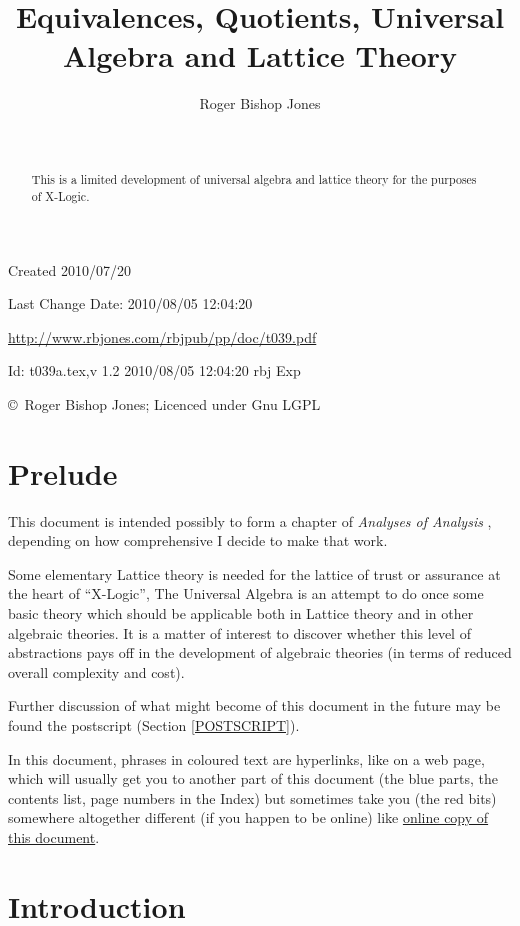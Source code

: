 \documentclass[11pt]{article}
\title{Equivalences, Quotients, Universal Algebra and Lattice Theory}
\author{Roger Bishop Jones}
\date{\ }
\begin{document}
\begin{titlepage}
\maketitle
\begin{abstract}
This is a limited development of universal algebra and lattice theory for the purposes of X-Logic.
\end{abstract}
\vfill

\begin{centering}
{\footnotesize

Created 2010/07/20

Last Change $ $Date: 2010/08/05 12:04:20 $ $

\href{http://www.rbjones.com/rbjpub/pp/doc/t039.pdf}
{http://www.rbjones.com/rbjpub/pp/doc/t039.pdf}

$ $Id: t039a.tex,v 1.2 2010/08/05 12:04:20 rbj Exp $ $

\copyright\ Roger Bishop Jones; Licenced under Gnu LGPL

}%
\end{centering}

\thispagestyle{empty}
\end{titlepage}

\newpage
\addtocounter{page}{1}
{\parskip=0pt\tableofcontents}

\section{Prelude}

This document is intended possibly to form a chapter of {\it Analyses of Analysis} \cite{rbjb001}, depending on how comprehensive I decide to make that work.

Some elementary Lattice theory is needed for the lattice of trust or assurance at the heart of ``X-Logic'',
The Universal Algebra is an attempt to do once some basic theory which should be applicable both in Lattice theory and in other algebraic theories.
It is a matter of interest to discover whether this level of abstractions pays off in the development of algebraic theories (in terms of reduced overall complexity and cost).

Further discussion of what might become of this document in the future may be found the postscript (Section \ref{POSTSCRIPT}).

In this document, phrases in coloured text are hyperlinks, like on a web page, which will usually get you to another part of this document (the blue parts, the contents list, page numbers in the Index) but sometimes take you (the red bits) somewhere altogether different (if you happen to be online) like \href{http://rbjones.com/rbjpub/pp/doc/t039.pdf}{online copy of this document}.

\section{Introduction}
\end{document}
